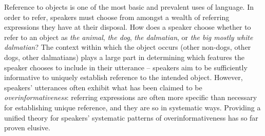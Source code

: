 \documentclass[11pt]{article}
\begin{document}
Reference to objects is one of the most basic and prevalent uses of language. In order to refer, speakers must choose from amongst a wealth of referring expressions they have at their disposal. How does a speaker choose whether to refer to an object as \emph{the animal}, \emph{the dog}, \emph{the dalmatian}, or \emph{the big mostly white dalmatian}? The context within which the object occurs (other non-dogs, other dogs, other dalmatians) plays a large part in determining which features the speaker chooses to include in their utterance -- speakers aim to be sufficiently informative to uniquely establish reference to the intended object. However, speakers' utterances often exhibit what has been claimed to be \emph{overinformativeness}: referring expressions are often more specific than necessary for establishing unique reference, and they are so in systematic ways. Providing a unified theory for speakers' systematic patterns of overinformativeness has so far proven elusive.
\end{document}
